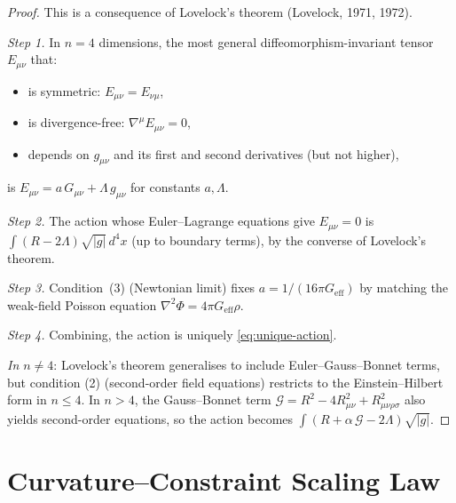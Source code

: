 \begin{proof}
This is a consequence of Lovelock's theorem (Lovelock, 1971, 1972).

\emph{Step 1.}  In $n = 4$ dimensions, the most general
diffeomorphism-invariant tensor $E_{\mu\nu}$ that:
\begin{itemize}
  \item is symmetric: $E_{\mu\nu} = E_{\nu\mu}$,
  \item is divergence-free: $\nabla^\mu E_{\mu\nu} = 0$,
  \item depends on $g_{\mu\nu}$ and its first and second derivatives
        (but not higher),
\end{itemize}
is $E_{\mu\nu} = a\,G_{\mu\nu} + \Lambda\,g_{\mu\nu}$ for constants
$a, \Lambda$.

\emph{Step 2.}  The action whose Euler--Lagrange equations give
$E_{\mu\nu} = 0$ is $\int (R - 2\Lambda)\sqrt{|g|}\,d^4x$ (up to
boundary terms), by the converse of Lovelock's theorem.

\emph{Step 3.}  Condition~(3) (Newtonian limit) fixes
$a = 1/(16\pi G_{\mathrm{eff}})$ by matching the weak-field Poisson
equation $\nabla^2\Phi = 4\pi G_{\mathrm{eff}}\rho$.

\emph{Step 4.}  Combining, the action is uniquely
\eqref{eq:unique-action}.

\emph{In $n \neq 4$}: Lovelock's theorem generalises to include
Euler--Gauss--Bonnet terms, but condition (2) (second-order field
equations) restricts to the Einstein--Hilbert form in $n \leq 4$.
In $n > 4$, the Gauss--Bonnet term $\mathcal{G} = R^2 - 4R_{\mu\nu}^2
+ R_{\mu\nu\rho\sigma}^2$ also yields second-order equations, so the
action becomes $\int (R + \alpha\,\mathcal{G} - 2\Lambda)\sqrt{|g|}$.
\end{proof}

\section{Curvature--Constraint Scaling Law}
\label{sec:ch15:scaling}

